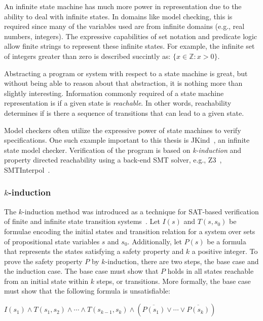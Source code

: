 An infinite state machine has much more power in representation due to the ability to deal with infinite states. In domains like model checking, this is required since many of the variables used are from infinite domains (e.g., real numbers, integers). The expressive capabilities of set notation and predicate logic allow finite strings to represent these infinite states. For example, the infinite set of integers greater than zero is described succintly as: $\{x \in \mathbb{Z} : x > 0\}$. 

Abstracting a program or system with respect to a state machine is great, but without being able to reason about that abstraction, it is nothing more than slightly interesting. Information commonly required of a state machine representation is if a given state is {\em reachable}. In other words, reachability determines if is there a sequence of transitions that can lead to a given state. 

Model checkers often utilize the expressive power of state machines to verify specifications. One such example important to this thesis is JKind~\cite{2017arXiv171201222G}, an infinite state model checker. Verification of the program is based on {\em k-induction} and property directed reachability using a back-end SMT solver, e.g., Z3~\cite{z3}, SMTInterpol~\cite{smtInterpol}.

\subsubsection{$k$-induction}
The $k$-induction method was introduced as a technique for SAT-based verification of finite and infinite state transition systems~\cite{sheeran2000checking}. Let $I(s)$ and $T(s, s_0)$ be formulae encoding the initial states and transition relation for a system over sets of propositional state variables $s$ and $s_0$. Additionally, let $P(s)$ be a formula that represents the states satisfying a safety property and $k$ a positive integer. To prove the safety property $P$ by $k$-induction, there are two steps, the base case and the induction case. The base case must show that $P$ holds in all states reachable from an initial state within $k$ steps, or transitions. More formally, the base case must show that the following formula is unsatisfiable:

\begin{center}
$I(s_1) \land T(s_1, s_2) \land \cdots \land T(s_{k−1}, s_k) \land (\overline{P(s_1)} \lor \cdots \lor \overline{P(s_k)})$
\end{center}

